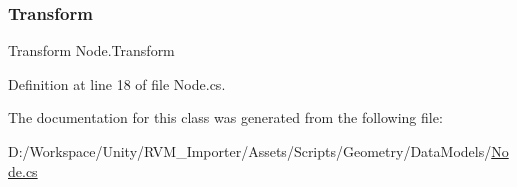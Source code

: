 \subsubsection{\texorpdfstring{Transform}{Transform}}
{\footnotesize\ttfamily Transform Node.\+Transform}



Definition at line 18 of file Node.\+cs.



The documentation for this class was generated from the following file\+:\begin{DoxyCompactItemize}
\item 
D\+:/\+Workspace/\+Unity/\+R\+V\+M\+\_\+\+Importer/\+Assets/\+Scripts/\+Geometry/\+Data\+Models/\mbox{\hyperlink{_node_8cs}{Node.\+cs}}\end{DoxyCompactItemize}
